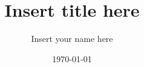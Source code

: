 
\newcommand{\thesistype}{master}

\title{Insert title here}

\author{Insert your name here}

\newcommand{\firstexaminer}{Name of your first examiner}
\newcommand{\secondexaminer}{Name of your second examiner}
\newcommand{\advisor}{Name of your advisor}
\newcommand{\secondadvisor}{Name of your second advisor}

\date{\today}

\newcommand{\keywords}{}
